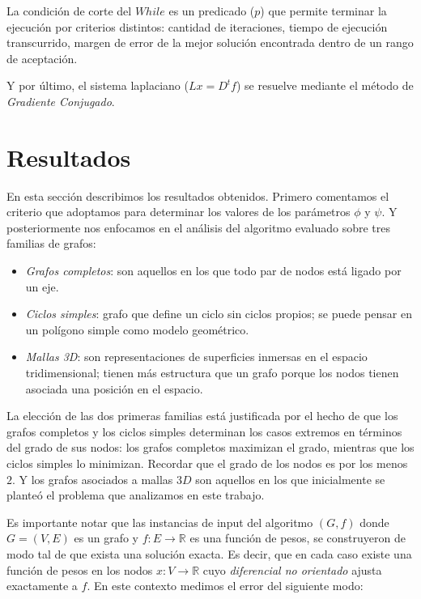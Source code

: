 \documentclass[conference,compsoc,a4paper]{IEEEtran}
\begin{document}
\smallskip

La condición de corte del $While$ es un predicado ($p$) que permite 
terminar la ejecución por criterios distintos: cantidad de iteraciones, 
tiempo de ejecución transcurrido, margen de error de la mejor solución 
encontrada dentro de un rango de aceptación.

\smallskip

Y por último, el sistema laplaciano ($Lx = D^t f$) se resuelve mediante 
el método de \emph{Gradiente Conjugado}.

\section{Resultados}

En esta sección describimos los resultados obtenidos. Primero 
comentamos el criterio que adoptamos para determinar los valores de los 
parámetros $\phi$ y $\psi$. Y posteriormente nos enfocamos en el 
análisis del algoritmo evaluado sobre tres familias de grafos: 

\begin{itemize}
	\item \emph{Grafos completos}: son aquellos en los que todo par de  
	nodos está ligado por un eje.
	\item \emph{Ciclos simples}: grafo que define un ciclo sin ciclos 
	propios; se puede pensar en un polígono simple como modelo 
	geométrico.
	\item \emph{Mallas 3D}: son representaciones de superficies 
	inmersas en el espacio tridimensional; tienen más estructura que un 
	grafo porque los nodos tienen asociada una posición en el espacio.
\end{itemize}

La elección de las dos primeras familias está justificada por el hecho 
de que los grafos completos y los ciclos simples determinan los casos 
extremos en términos del grado de sus nodos: los grafos completos 
maximizan el grado, mientras que los ciclos simples lo minimizan. 
Recordar que el grado de los nodos es por los menos $2$. Y los grafos 
asociados a mallas $3D$ son aquellos en los que inicialmente se planteó 
el problema que analizamos en este trabajo.

\smallskip

Es importante notar que las instancias de input del algoritmo $(G,f)$ 
donde $G=(V,E)$ es un grafo y $f: E \rightarrow \mathbb{R}$ es una 
función de pesos, se construyeron de modo tal de que exista una 
solución exacta. Es decir, que en cada caso existe una función de pesos 
en los nodos $x: V \rightarrow \mathbb{R}$ cuyo \textit{diferencial no 
orientado} ajusta exactamente a $f$. En este contexto medimos el error 
del siguiente modo:
\end{document}
